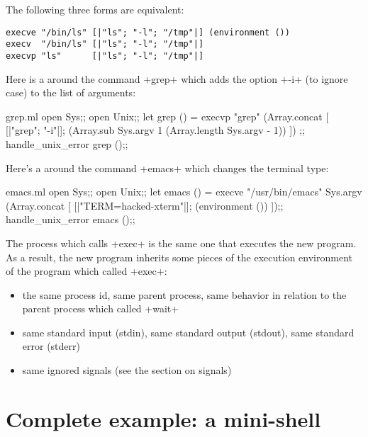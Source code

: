 \begin{example}
The following three forms are equivalent:
\begin{lstlisting}
execve "/bin/ls" [|"ls"; "-l"; "/tmp"|] (environment ())
execv  "/bin/ls" [|"ls"; "-l"; "/tmp"|]
execvp "ls"      [|"ls"; "-l"; "/tmp"|]
\end{lstlisting}
\end{example}

\begin{example}
Here is a  around the command \ml+grep+ which
adds the option \ml+-i+ (to ignore case) to the list of arguments:
%
\begin{listingcodefile}{grep.ml}
open Sys;;
open Unix;;
let grep () =
 execvp "grep"
   (Array.concat
      [ [|"grep"; "-i"|];
        (Array.sub Sys.argv 1 (Array.length Sys.argv - 1)) ])
;;
handle_unix_error grep ();;
\end{listingcodefile}
\end{example}

\begin{example}
Here's a  around the command \ml+emacs+ which
changes the terminal type:
%
\begin{listingcodefile}{emacs.ml}
open Sys;;
open Unix;;
let emacs () =
 execve "/usr/bin/emacs" Sys.argv
   (Array.concat [ [|"TERM=hacked-xterm"|]; (environment ()) ]);;
handle_unix_error emacs ();;
\end{listingcodefile}
\end{example}

The process which calls \ml+exec+ is the same one that executes the
new program.  As a result, the new program inherits some pieces of
the execution environment of the program which called \ml+exec+:
\begin{itemize}
\item the same process id, same parent process, same behavior in
relation to the parent process which called \ml+wait+
\item same standard input (stdin), same standard output (stdout),
same standard error (stderr)
\item same ignored signals (see the section on signals)
\end{itemize}

\section{Complete example: a mini-shell}

